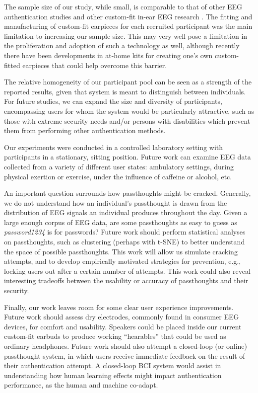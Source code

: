 \documentclass[a4paper,twoside]{article}
\begin{document}
The sample size of our study, while small, is comparable to that of other EEG authentication studies \cite{Ashby2011,Marcel2007a,Poulos2002,Chuang2013b,curran2016passthoughts} and other custom-fit in-ear EEG research \cite{Kidmose2013a,Mikkelsen2015}. The fitting and manufacturing of custom-fit earpieces for each recruited participant was the main limitation to increasing our sample size. This may very well pose a limitation in the proliferation and adoption of such a technology as well, although recently there have been developments in at-home kits for creating one's own custom-fitted earpieces \cite{voix2015settable} that could help overcome this barrier.

The relative homogeneity of our participant pool can be seen as a strength of the reported results, given that system is meant to distinguish between individuals. For future studies, we can expand the size and diversity of participants, encompassing users for whom the system would be particularly attractive, such as those with extreme security needs and/or persons with disabilities which prevent them from performing other authentication methods.

Our experiments were conducted in a controlled laboratory setting with participants in a stationary, sitting position. Future work can examine EEG data collected from a variety of different user states: ambulatory settings, during physical exertion or exercise, under the influence of caffeine or alcohol, etc.

An important question surrounds how passthoughts might be cracked. Generally, we do not understand how an individual's passthought is drawn from the distribution of EEG signals an individual produces throughout the day. Given a large enough corpus of EEG data, are some passthoughts as easy to guess as \textit{password1234} is for passwords? Future work should perform statistical analyses on passthoughts, such as clustering (perhaps with t-SNE) to better understand the space of possible passthoughts. This work will allow us simulate cracking attempts, and to develop empirically motivated strategies for prevention, e.g., locking users out after a certain number of attempts. This work could also reveal interesting tradeoffs between the usability or accuracy of passthoughts and their security.

Finally, our work leaves room for some clear user experience improvements. Future work should assess dry electrodes, commonly found in consumer EEG devices, for comfort and usability. 
Speakers could be placed inside our current custom-fit earbuds to produce working ``hearables'' that could be used as ordinary headphones. Future work should also attempt a closed-loop (or online) passthought system, in which users receive immediate feedback on the result of their authentication attempt. A closed-loop BCI system would assist in understanding how human learning effects might impact authentication performance, as the human and machine co-adapt.
\end{document}
